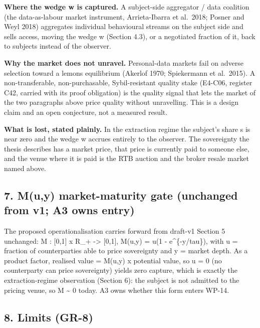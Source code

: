 \documentclass[
  11pt,
]{article}
\begin{document}
\textbf{Where the wedge w is captured.} A subject-side aggregator / data
coalition (the data-as-labour market instrument, Arrieta-Ibarra et
al.~2018; Posner and Weyl 2018) aggregates individual behavioural
streams on the subject side and sells access, moving the wedge w
(Section 4.3), or a negotiated fraction of it, back to subjects instead
of the observer.

\textbf{Why the market does not unravel.} Personal-data markets fail on
adverse selection toward a lemons equilibrium (Akerlof 1970; Spiekermann
et al.~2015). A non-transferable, non-purchasable, Sybil-resistant
quality stake (E4-C06, register C42, carried with its proof obligation)
is the quality signal that lets the market of the two paragraphs above
price quality without unravelling. This is a design claim and an open
conjecture, not a measured result.

\textbf{What is lost, stated plainly.} In the extraction regime the
subject's share s is near zero and the wedge w accrues entirely to the
observer. The sovereignty the thesis describes has a market price, that
price is currently paid to someone else, and the venue where it is paid
is the RTB auction and the broker resale market named above.

\subsection{7. M(u,y) market-maturity gate (unchanged from v1; A3 owns
entry)}\label{muy-market-maturity-gate-unchanged-from-v1-a3-owns-entry}

The proposed operationalisation carries forward from draft-v1 Section 5
unchanged: M : {[}0,1{]} x R\_+ -\textgreater{} {[}0,1{]}, M(u,y) = u(1
- e\^{}\{-y/tau\}), with u = fraction of counterparties able to price
sovereignty and y = market depth. As a product factor, realised value =
M(u,y) x potential value, so u = 0 (no counterparty can price
sovereignty) yields zero capture, which is exactly the extraction-regime
observation (Section 6): the subject is not admitted to the pricing
venue, so M \textasciitilde{} 0 today. A3 owns whether this form enters
WP-14.

\subsection{8. Limits (GR-8)}\label{limits-gr-8}
\end{document}

